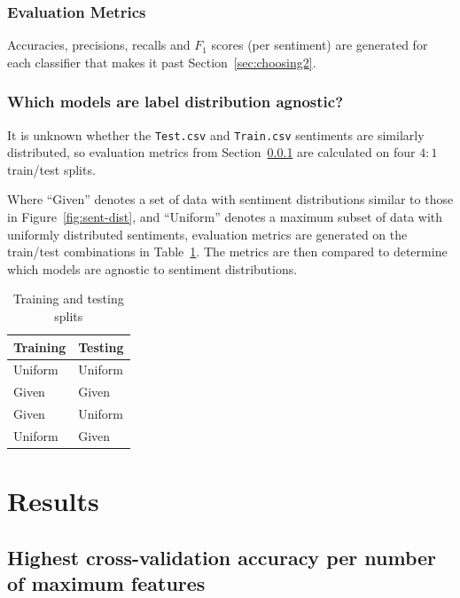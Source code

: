 \documentclass[11pt]{article}
\begin{document}
\subsubsection{Evaluation Metrics}\label{sec:evalmetrics}

Accuracies, precisions, recalls and $F_1$ scores (per sentiment) are generated for each classifier that makes it past Section~\ref{sec:choosing2}.

\subsubsection{Which models are label distribution agnostic?}

It is unknown whether the \texttt{Test.csv} and \texttt{Train.csv} sentiments are similarly distributed, 
so evaluation metrics from Section~\ref{sec:evalmetrics} are calculated on four $4:1$ train/test splits.

Where ``Given'' denotes a set of data with sentiment distributions similar to those in Figure~\ref{fig:sent-dist},
and ``Uniform'' denotes a maximum subset of data with uniformly distributed sentiments,
evaluation metrics are generated on the train/test combinations in Table~\ref{tbl:train-test}.
The metrics are then compared to determine which models are agnostic to sentiment distributions.

\begin{table}[H]
	\begin{center}
		\begin{tabular}{|l|l|}			
			\hline
			Training & Testing \\
			\hline
			Uniform & Uniform \\
			Given & Given \\
			Given & Uniform \\
			Uniform & Given \\
			\hline
		\end{tabular}
		\caption{Training and testing splits}
		\label{tbl:train-test}
	\end{center}
\end{table}

\section{Results}\label{sec:results}

\subsection{Highest cross-validation accuracy per number of maximum features}\label{sec:mfresults}
\end{document}
